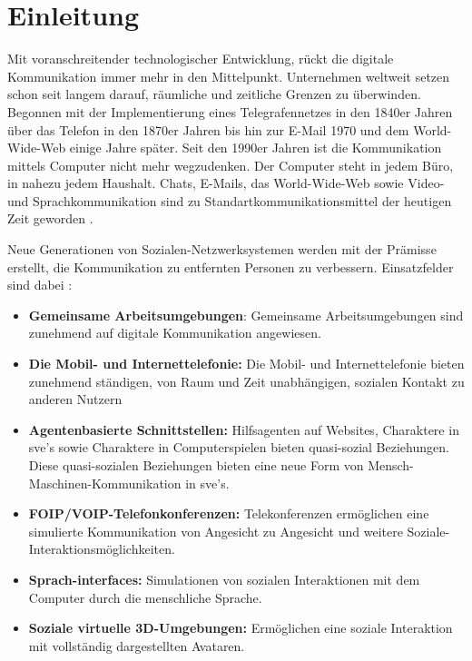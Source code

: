 \documentclass[a4paper,11pt]{article}%
\renewcommand{\\}{\vspace*{0.5\baselineskip} \newline}
\begin{document}

\section*{Einleitung}
	Mit voranschreitender technologischer Entwicklung, rückt die digitale Kommunikation immer mehr in den Mittelpunkt. Unternehmen weltweit setzen schon seit langem darauf, räumliche und zeitliche Grenzen zu überwinden. Begonnen mit der Implementierung eines Telegrafennetzes in den 1840er Jahren über das Telefon in den 1870er Jahren bis hin zur E-Mail 1970 und dem World-Wide-Web einige Jahre später.
	Seit den 1990er Jahren ist die Kommunikation mittels Computer nicht mehr wegzudenken. Der Computer steht in jedem Büro, in nahezu jedem Haushalt. Chats, E-Mails, das World-Wide-Web sowie Video- und Sprachkommunikation sind zu Standartkommunikationsmittel der heutigen Zeit geworden \citep[p. 14-16]{thurlow2004computer}.
	
Neue Generationen von Sozialen-Netzwerksystemen werden mit der Prämisse erstellt, die Kommunikation zu entfernten Personen zu verbessern.
Einsatzfelder sind dabei :
\begin{itemize}
	\item{\textbf{Gemeinsame Arbeitsumgebungen}: Gemeinsame Arbeitsumgebungen sind zunehmend auf digitale Kommunikation angewiesen.}
	\item{\textbf{Die Mobil- und Internettelefonie:} Die Mobil- und Internettelefonie bieten zunehmend ständigen, von Raum und Zeit unabhängigen, sozialen Kontakt zu anderen Nutzern}
	\item{\textbf{Agentenbasierte Schnittstellen:} Hilfsagenten auf Websites, Charaktere in \ac{sve}'s sowie Charaktere in Computerspielen bieten \dq{}quasi\dq{}-sozial Beziehungen. Diese \dq{}quasi\dq{}-sozialen Beziehungen bieten eine neue Form von Mensch-Maschinen-Kommunikation in \ac{sve}'s.} 
	\item{\textbf{FOIP/VOIP-Telefonkonferenzen:} Telekonferenzen ermöglichen eine simulierte Kommunikation von Angesicht zu Angesicht und weitere Soziale-Interaktionsmöglichkeiten.}
	\item{\textbf{Sprach-interfaces:} Simulationen von sozialen Interaktionen mit dem Computer durch die menschliche Sprache.}
	\item{\textbf{Soziale virtuelle 3D-Umgebungen:} Ermöglichen eine soziale Interaktion mit vollständig dargestellten Avataren.}
\end{itemize}
\end{document}
